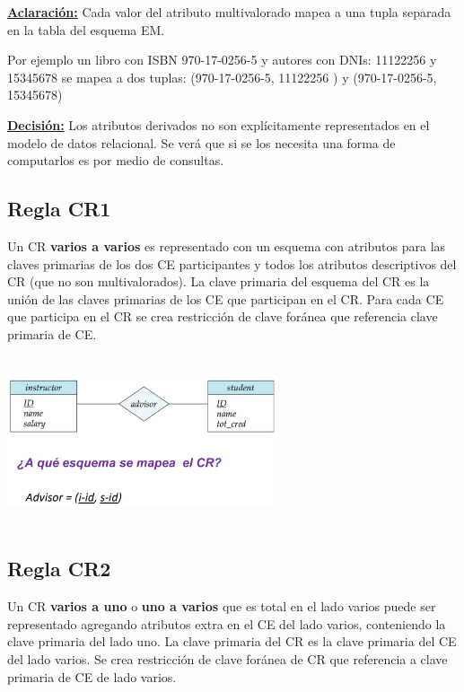 \documentclass[12pt,a4paper]{report}
\begin{document}
		\underline{\textbf{Aclaración:}} Cada valor del atributo multivalorado mapea a una tupla separada en la tabla del esquema EM.
		\par Por ejemplo un libro con ISBN 970-17-0256-5 y autores con DNIs: 11122256 y 15345678 se mapea a dos tuplas: (970-17-0256-5, 11122256 ) y (970-17-0256-5, 15345678)

		\vspace{7mm}
		\underline{\textbf{Decisión:}} Los atributos derivados no son explícitamente representados en el modelo de datos relacional. Se verá que si se los necesita una forma de computarlos es por medio de consultas.
		
		\subsection{Regla CR1}
			\par Un CR \textbf{varios a varios} es representado con un esquema con atributos para las claves primarias de los dos CE participantes y todos los atributos descriptivos del CR (que no son multivalorados). La clave primaria del esquema del CR es la unión de las claves primarias de los CE que participan en el CR. Para cada CE que participa en el CR se crea restricción de clave foránea que referencia clave primaria de CE.

			\begin{center}
				\includegraphics[width=8cm, height=5cm]{./imagenes/cr1.png}
			\end{center}

		\subsection{Regla CR2}
			\par Un CR \textbf{varios a uno} o \textbf{uno a varios} que es total en el lado varios puede ser representado agregando atributos extra en el CE del lado varios, conteniendo la clave primaria del lado uno. La clave primaria del CR es la clave primaria del CE del lado varios. Se crea restricción de clave foránea de CR que referencia a clave primaria de CE de lado varios.
\end{document}

